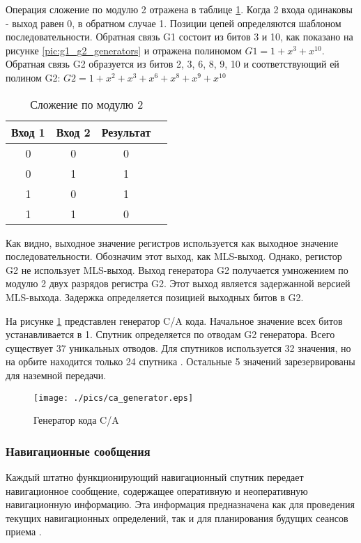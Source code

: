 Операция сложение по модулю 2 отражена в таблице \ref{tab:mod2}. Когда 2 входа одинаковы - выход равен 0, в обратном
случае 1. Позиции цепей определяются шаблоном последовательности. Обратная связь G1 состоит из битов 3 и 10, как 
показано на рисунке \ref{pic:g1_g2_generators} и отражена полиномом ${G1=1 + x^{3} + x^{10}}$. Обратная связь G2
образуется из битов 2, 3, 6, 8, 9, 10 и соответствующий ей полином G2:
${G2=1 + x^{2} + x^{3} + x^{6} + x^{8} + x^{9} + x^{10}}$ 

\begin{table}[H]
\begin{center}
\caption{Сложение по модулю 2}
\label{tab:mod2}
\begin{tabular}{|c|c|c|c|}
	\hline
		Вход 1 & Вход 2 & Результат \\
	\hline
		0 & 0 & 0 \\
	\hline
		0 & 1 & 1 \\
	\hline
		1 & 0 & 1 \\
	\hline
		1 & 1 & 0 \\
	\hline
\end{tabular}
\end{center}
\end{table}

Как видно, выходное значение регистров используется как выходное значение последовательности. Обозначим этот выход, как
MLS-выход. Однако, регистор G2 не использует MLS-выход. Выход генератора G2 получается умножением по модулю 2
двух разрядов регистра G2. Этот выход является задержанной версией MLS-выхода. Задержка определяется позицией выходных
битов в G2.

На рисунке \ref{pic:ca_generator} представлен генератор C/A кода. Начальное значение всех битов устанавливается в 1.
Спутник определяется по отводам G2 генератора. Всего существует 37 уникальных отводов. Для спутников используется 32
значения, но на орбите находится только 24 спутника \cite{tsui}. Остальные 5 значений зарезервированы для наземной
передачи.

\begin{figure}
\begin{center}
\texttt{[image: ./pics/ca\_generator.eps]}
\end{center}
\caption{Генератор кода C/A}
\label{pic:ca_generator}
\end{figure}

\subsubsection{Навигационные сообщения}
Каждый штатно функционирующий навигационный спутник передает навигационное сообщение, содержащее оперативную и неоперативную
навигационную информацию. Эта информация предназначена как для проведения текущих навигационных определений, так и для
планирования будущих сеансов приема \cite{yacenkov}.

